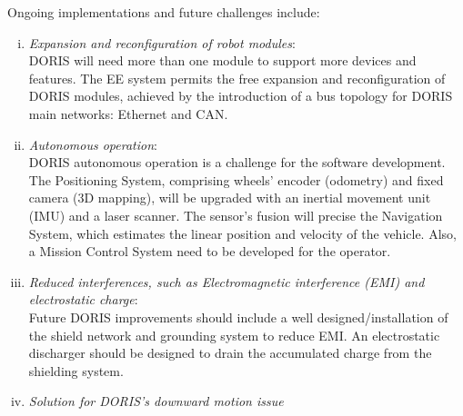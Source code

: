 \documentclass{ifacconf}
\begin{document}
Ongoing implementations and future challenges include:
\begin{enumerate}[i)]
  \item \emph{Expansion and reconfiguration of robot modules}:\\
  \newline
  DORIS will need more than one module to support more devices and features.
  The EE system permits the free expansion and reconfiguration of DORIS
  modules, achieved by the introduction of a bus topology for DORIS
  main networks: Ethernet and CAN.\\
  \item \emph{Autonomous operation}:\\
  \newline
  DORIS autonomous operation is a challenge for the software development. The
  Positioning System, comprising wheels' encoder (odometry) and
  fixed camera (3D mapping), will be upgraded with an inertial movement unit
  (IMU) and a laser scanner. The sensor's fusion will precise the Navigation
  System, which estimates the linear position and velocity of the vehicle. Also,
  a Mission Control System need to be developed for the operator.\\
  \newline
  \item \emph{Reduced interferences, such as Electromagnetic interference (EMI) and electrostatic charge}:\\
  \newline
  Future DORIS improvements should include a well designed/installation of the
  shield network and grounding system to reduce EMI. An electrostatic discharger
  should be designed to drain the accumulated charge from the shielding system.\\
  \newline
  \item \emph{Solution for DORIS's downward motion issue}

\end{enumerate}
\end{document}
